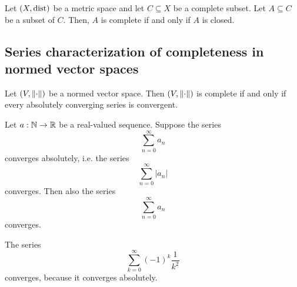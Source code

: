 \begin{proposition}
    Let $(X, \text{dist})$ be a metric space and let $C \subseteq X$ be a complete subset. Let $A \subseteq C$ be a subset of
    $C$. Then, $A$ is complete if and only if $A$ is closed.
\end{proposition}

\subsection{Series characterization of completeness in normed vector spaces}
\begin{theorem}
    Let $(V, \norm{\cdot})$ be a normed vector space. Then $(V, \norm{\cdot})$ is complete if and only if every
    absolutely converging series is convergent.
\end{theorem}

\begin{corollary}
    Let $a: \mathbb{N} \to \mathbb{R}$ be a real-valued sequence. Suppose the series
    $$\sum_{n=0}^\infty a_n$$
    converges absolutely, i.e. the series
    $$\sum_{n=0}^\infty |a_n|$$
    converges. Then also the series
    $$\sum_{n=0}^\infty a_n$$
    converges.
\end{corollary}
\begin{example}
    The series
    $$\sum_{k=0}^\infty (-1)^k\frac{1}{k^2}$$
    converges, because it converges absolutely.
\end{example}
